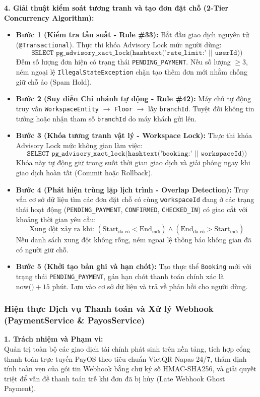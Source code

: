 \noindent\textbf{4. Giải thuật kiểm soát tương tranh và tạo đơn đặt chỗ (2-Tier Concurrency Algorithm):}
\begin{itemize}
    \item \textbf{Bước 1 (Kiểm tra tần suất - Rule \#33):} Bắt đầu giao dịch nguyên tử (\texttt{@Transactional}). Thực thi khóa Advisory Lock mức người dùng:
    $$\texttt{SELECT pg\_advisory\_xact\_lock(hashtext('rate\_limit:' || userId))}$$
    Đếm số lượng đơn hiện có trạng thái \texttt{PENDING\_PAYMENT}. Nếu số lượng $\ge 3$, ném ngoại lệ \texttt{IllegalStateException} chặn tạo thêm đơn mới nhằm chống giữ chỗ ảo (Spam Hold).
    \item \textbf{Bước 2 (Suy diễn Chi nhánh tự động - Rule \#42):} Máy chủ tự động truy vấn \texttt{WorkspaceEntity} $\rightarrow$ \texttt{Floor} $\rightarrow$ lấy \texttt{branchId}. Tuyệt đối không tin tưởng hoặc nhận tham số \texttt{branchId} do máy khách gửi lên.
    \item \textbf{Bước 3 (Khóa tương tranh vật lý - Workspace Lock):} Thực thi khóa Advisory Lock mức không gian làm việc:
    $$\texttt{SELECT pg\_advisory\_xact\_lock(hashtext('booking:' || workspaceId))}$$
    Khóa này tự động giữ trong suốt thời gian giao dịch và giải phóng ngay khi giao dịch hoàn tất (Commit hoặc Rollback).
    \item \textbf{Bước 4 (Phát hiện trùng lặp lịch trình - Overlap Detection):} Truy vấn cơ sở dữ liệu tìm các đơn đặt chỗ có cùng \texttt{workspaceId} đang ở các trạng thái hoạt động (\texttt{PENDING\_PAYMENT}, \texttt{CONFIRMED}, \texttt{CHECKED\_IN}) có giao cắt với khoảng thời gian yêu cầu:
    $$\text{Xung đột xảy ra khi: } (\text{Start}_{\text{đã\_có}} < \text{End}_{\text{mới}}) \land (\text{End}_{\text{đã\_có}} > \text{Start}_{\text{mới}})$$
    Nếu danh sách xung đột không rỗng, ném ngoại lệ thông báo không gian đã có người giữ chỗ.
    \item \textbf{Bước 5 (Khởi tạo bản ghi và hạn chót):} Tạo thực thể \texttt{Booking} mới với trạng thái \texttt{PENDING\_PAYMENT}, gán hạn chót thanh toán chính xác là $\text{now()} + 15\text{ phút}$. Lưu vào cơ sở dữ liệu và trả về phản hồi cho người dùng.
\end{itemize}

\subsubsection{Hiện thực Dịch vụ Thanh toán và Xử lý Webhook (PaymentService \& PayosService)}

\noindent\textbf{1. Trách nhiệm và Phạm vi:}\\
Quản trị toàn bộ các giao dịch tài chính phát sinh trên nền tảng, tích hợp cổng thanh toán trực tuyến PayOS theo tiêu chuẩn VietQR Napas 24/7, thẩm định tính toàn vẹn của gói tin Webhook bằng chữ ký số HMAC-SHA256, và giải quyết triệt để vấn đề thanh toán trễ khi đơn đã bị hủy (Late Webhook Ghost Payment).

